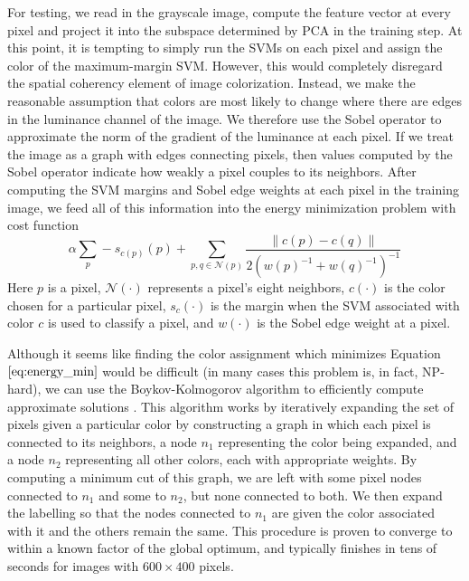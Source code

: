 For testing, we read in the grayscale image, compute the feature vector at every pixel and project it into the subspace determined by PCA in the training step. At this point, it is tempting to simply run the SVMs on each pixel and assign the color of the maximum-margin SVM.  However, this would completely disregard the spatial coherency element of image colorization.  Instead, we make the reasonable assumption that colors are most likely to change where there are edges in the luminance channel of the image.  We therefore use the Sobel operator to approximate the norm of the gradient of the luminance at each pixel. If we treat the image as a graph with edges connecting pixels, then values computed by the Sobel operator indicate how weakly a pixel couples to its neighbors. 
After computing the SVM margins and Sobel edge weights at each pixel in the training image, we feed all of this information into the energy minimization problem with cost function
\begin{equation}
    \label{eq:energy_min}
    \alpha \sum_p -s_{c(p)} (p) + \sum_{p,q \in \mathcal{N}(p)} \frac{\| c(p) - c(q) \|} {2(w(p)^{-1} + w(q)^{-1})^{-1}}
\end{equation}
Here $p$ is a pixel, $\mathcal{N}(\cdot)$ represents a pixel's eight neighbors, $c(\cdot)$ is the color chosen for a particular pixel, $s_{c} (\cdot)$ is the margin when the SVM associated with color $c$ is used to classify a pixel, and $w(\cdot)$ is the Sobel edge weight at a pixel.

Although it seems like finding the color assignment which minimizes Equation $\ref{eq:energy_min}$ would be difficult (in many cases this problem is, in fact, NP-hard), we can use the Boykov-Kolmogorov algorithm to efficiently compute approximate solutions \cite{boykov2001fast, boykov2004experimental}.  This algorithm works by iteratively expanding the set of pixels given a particular color by constructing a graph in which each pixel is connected to its neighbors, a node $n_1$ representing the color being expanded, and a node $n_2$ representing all other colors, each with appropriate weights.  By computing a minimum cut of this graph, we are left with some pixel nodes connected to $n_1$ and some to $n_2$, but none connected to both.  We then expand the labelling so that the nodes connected to $n_1$ are given the color associated with it and the others remain the same.  This procedure is proven to converge to within a known factor of the global optimum, and typically finishes in tens of seconds for images with $600 \times 400$ pixels.